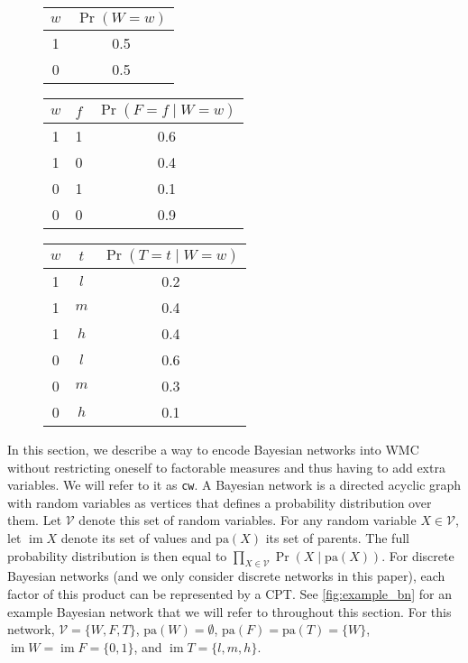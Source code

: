 \documentclass{uai2021} %
\theoremstyle{definition}
\DeclareMathOperator{\im}{im}
\begin{document}
\begin{figure*}
  \centering
  \begin{subfigure}{0.2\textwidth}
    \centering
  \end{subfigure}%
  \begin{subfigure}{0.8\textwidth}
    \centering
    \begin{tabular}[t]{cc}
      \toprule
      $w$ & $\Pr(W = w)$ \\
      \midrule
      1 & 0.5 \\
      0 & 0.5 \\
      \bottomrule
    \end{tabular}
    \begin{tabular}[t]{ccc}
      \toprule
      $w$ & $f$ & $\Pr(F = f \mid W = w)$ \\
      \midrule
      1 & 1 & 0.6 \\
      1 & 0 & 0.4 \\
      0 & 1 & 0.1 \\
      0 & 0 & 0.9 \\
      \bottomrule
    \end{tabular}
    \begin{tabular}[t]{ccc}
      \toprule
      $w$ & $t$ & $\Pr(T = t \mid W = w)$ \\
      \midrule
      1 & $l$ & 0.2 \\
      1 & $m$ & 0.4 \\
      1 & $h$ & 0.4 \\
      0 & $l$ & 0.6 \\
      0 & $m$ & 0.3 \\
      0 & $h$ & 0.1 \\
      \bottomrule
    \end{tabular}
  \end{subfigure}
  \caption{An example Bayesian network with its CPTs.}
  \label{fig:example_bn}
\end{figure*}

In this section, we describe a way to encode Bayesian networks into WMC without
restricting oneself to factorable measures and thus having to add extra
variables. We will refer to it as \texttt{cw}. A Bayesian network is a directed
acyclic graph with random variables as vertices that defines a probability
distribution over them. Let $\mathcal{V}$ denote this set of random variables.
For any random variable $X \in \mathcal{V}$, let $\im X$ denote its set of
values and $\mathrm{pa}(X)$ its set of parents. The full probability
distribution is then equal to $\prod_{X \in \mathcal{V}} \Pr(X \mid
\mathrm{pa}(X))$. For discrete Bayesian networks (and we only consider discrete
networks in this paper), each factor of this product can be represented by a
CPT. See \cref{fig:example_bn} for an example Bayesian network that we will
refer to throughout this section. For this network, $\mathcal{V} = \{ W, F, T
\}$, $\mathrm{pa}(W) = \emptyset$, $\mathrm{pa}(F) = \mathrm{pa}(T) = \{ W \}$,
$\im W = \im F = \{0, 1 \}$, and $\im T = \{ l, m, h \}$.
\end{document}
